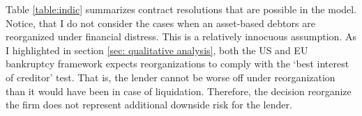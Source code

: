 \documentclass[12pt]{article}
\begin{document}
Table \ref{table:indic} summarizes contract resolutions that are possible in the model. Notice, that I do not consider the cases when an asset-based debtors are reorganized under financial distress. This is a relatively innocuous assumption. As I highlighted in section \ref{sec: qualitative analysis}, both the US and EU bankruptcy framework expects reorganizations to comply with the `best interest of creditor' test. That is, the lender cannot be worse off under reorganization than it would have been in case of liquidation. Therefore, the decision reorganize the firm does not represent additional downside risk for the lender. 

\begin{table}[h!]
\centering
{} %
\caption{Possible debt contract resolutions of the model}
\label{table:indic}
\end{table}
\end{document}
